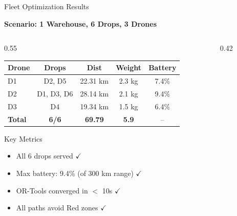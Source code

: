 \documentclass[aspectratio=169, 11pt]{beamer}
\begin{document}
\begin{frame}{Fleet Optimization Results}
\begin{center}
\textcolor{neongreen}{\textbf{Scenario: 1 Warehouse, 6 Drops, 3 Drones}}\\[0.3cm]
\end{center}

\begin{columns}[T]
\begin{column}{0.55\textwidth}
\small
\begin{tabular}{@{}lcccc@{}}
\toprule
\textcolor{neongreen}{\textbf{Drone}} & \textbf{Drops} & \textbf{Dist} & \textbf{Weight} & \textbf{Battery} \\
\midrule
\textcolor{neongreen}{D1} & D2, D5 & 22.31 km & 2.3 kg & 7.4\% \\
\textcolor{accentblue}{D2} & D1, D3, D6 & 28.14 km & 2.1 kg & 9.4\% \\
\textcolor{warnorange}{D3} & D4 & 19.34 km & 1.5 kg & 6.4\% \\
\midrule
\textbf{Total} & \textbf{6/6} & \textbf{69.79} & \textbf{5.9} & -- \\
\bottomrule
\end{tabular}

\vspace{0.4cm}
\begin{exampleblock}{Key Metrics}
\footnotesize
\begin{itemize}
    \item All 6 drops served $\checkmark$
    \item Max battery: 9.4\% (of 300 km range) $\checkmark$
    \item OR-Tools converged in $<$ 10s $\checkmark$
    \item All paths avoid Red zones $\checkmark$
\end{itemize}
\end{exampleblock}
\end{column}
\begin{column}{0.42\textwidth}
\end{column}
\end{columns}
\end{frame}
\end{document}
